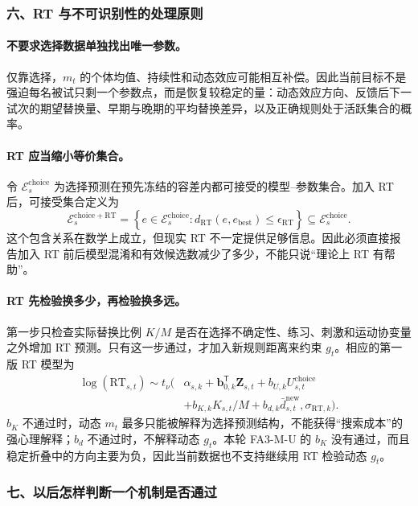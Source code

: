 \subsubsection{六、RT 与不可识别性的处理原则}

\paragraph{不要求选择数据单独找出唯一参数。}
仅靠选择，$m_t$ 的个体均值、持续性和动态效应可能相互补偿。因此当前目标不是强迫每名被试只剩一个参数点，而是恢复较稳定的量：动态效应方向、反馈后下一试次的期望替换量、早期与晚期的平均替换差异，以及正确规则处于活跃集合的概率。

\paragraph{RT 应当缩小等价集合。}
令 $\mathcal E^{\mathrm{choice}}_s$ 为选择预测在预先冻结的容差内都可接受的模型--参数集合。加入 RT 后，可接受集合定义为
\begin{equation}
\mathcal E^{\mathrm{choice+RT}}_s
=\left\{e\in\mathcal E^{\mathrm{choice}}_s:
d_{\mathrm{RT}}(e,e_{\mathrm{best}})\leq\epsilon_{\mathrm{RT}}\right\}
\subseteq\mathcal E^{\mathrm{choice}}_s.
\label{eq:model0806-equivalence}
\end{equation}
这个包含关系在数学上成立，但现实 RT 不一定提供足够信息。因此必须直接报告加入 RT 前后模型混淆和有效候选数减少了多少，不能只说“理论上 RT 有帮助”。

\paragraph{RT 先检验换多少，再检验换多远。}
第一步只检查实际替换比例 $K/M$ 是否在选择不确定性、练习、刺激和运动协变量之外增加 RT 预测。只有这一步通过，才加入新规则距离来约束 $g_t$。相应的第一版 RT 模型为
\begin{align}
\log(\mathrm{RT}_{s,t})\sim t_\nu\!\Big(&
\alpha_{s,k}+\mathbf b_{0,k}^{\mathsf T}\mathbf Z_{s,t}
+b_{U,k}U^{\mathrm{choice}}_{s,t}\nonumber\\
&+b_{K,k}K_{s,t}/M
+b_{d,k}\bar d^{\mathrm{new}}_{s,t},
\sigma_{\mathrm{RT},k}\Big).
\label{eq:model0806-rt}
\end{align}
$b_K$ 不通过时，动态 $m_t$ 最多只能被解释为选择预测结构，不能获得“搜索成本”的强心理解释；$b_d$ 不通过时，不解释动态 $g_t$。本轮 FA3-M-U 的 $b_K$ 没有通过，而且稳定折叠中的方向主要为负，因此当前数据也不支持继续用 RT 检验动态 $g_t$。


\subsubsection{七、以后怎样判断一个机制是否通过}

